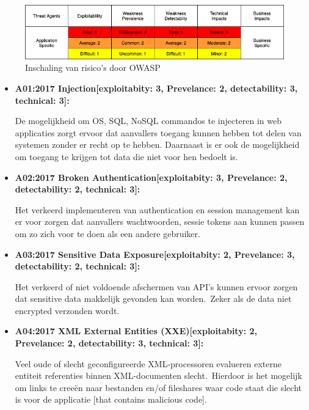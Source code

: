 \begin{figure}[H]
    \myfloatalign
    \includegraphics[width=12cm]{gfx/risk tabel}
    \caption{Inschaling van risico's door OWASP}
    \label{fig:risico inschaling}
\end{figure}

\begin{itemize}

    \item \textbf{A01:2017 Injection[exploitabity: 3, Prevelance: 2, detectability: 3, technical: 3]:}

    De mogelijkheid om OS, SQL, NoSQL commandos te injecteren in web applicaties zorgt ervoor dat aanvallers toegang kunnen hebben tot delen van systemen zonder er recht op te hebben.
    Daarnaast is er ook de mogelijkheid om toegang te krijgen tot data die niet voor hen bedoelt is.


    \item \textbf{A02:2017 Broken Authentication[exploitabity: 3, Prevelance: 2, detectability: 2, technical: 3]:}

    Het verkeerd implementeren van authentication en session management kan er voor zorgen dat aanvallers wachtwoorden, sessie tokens aan kunnen passen om zo zich voor te doen als een andere gebruiker.

    \item \textbf{A03:2017 Sensitive Data Exposure[exploitabity: 2, Prevelance: 3, detectability: 2, technical: 3]:}

    Het verkeerd of niet voldoende afschermen van API's kunnen ervoor zorgen dat sensitive data makkelijk gevonden kan worden.\ Zeker als de data niet encrypted verzonden wordt.

    \item \textbf{A04:2017 XML External Entities (XXE)[exploitabity: 2, Prevelance: 2, detectability: 3, technical: 3]:}

    Veel oude of slecht geconfigureerde XML-processoren evalueren externe entiteit referenties binnen XML-documenten slecht.\ Hierdoor is het mogelijk om links te creeën naar bestanden en/of fileshares waar code staat die slecht is voor de applicatie [that contains malicious code].


\end{itemize}
